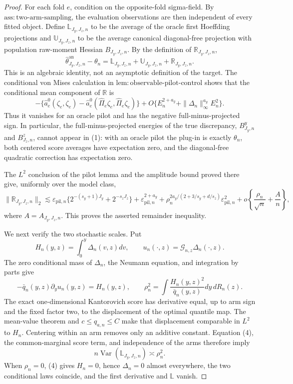 \documentclass{article}
\begin{document}
\begin{proof}
For each fold \(e\), condition on the opposite-fold sigma-field. By \(\mathrm{ass{:}two\text{-}arm\text{-}sampling}\), the evaluation observations are then independent of every fitted object.  Define \(\mathbb L_{J_y,J_z,n}\) to be the average of the oracle first Hoeffding projections and \(\mathbb U_{J_y,J_z,n}\) to be the average canonical diagonal-free projection with population raw-moment Hessian \(B_{J_y,J_z,n}\).  By the definition of \(\mathbb R_{J_y,J_z,n}\),
\[
\widehat\theta^{\mathrm{an}}_{J_y,J_z,n}-\theta_n
=\mathbb L_{J_y,J_z,n}+\mathbb U_{J_y,J_z,n}+\mathbb R_{J_y,J_z,n}. \tag{1}
\]
This is an algebraic identity, not an asymptotic definition of the target.  The conditional von Mises calculation in \(\mathrm{lem{:}observable\text{-}pilot\text{-}control}\) shows that the conditional mean component of \(\mathbb R\) is
\[
-\{\widehat a_e^0(\zeta_e,\zeta_e)
-\widehat a_e^0(\widehat\Pi_e\zeta_e,\widehat\Pi_e\zeta_e)\}
+O\{E_n^{2+a_y}+\|\Delta_n\|_\infty^{a_y}E_n^2\}.              \tag{2}
\]
Thus it vanishes for an oracle pilot and has the negative full-minus-projected sign.  In particular, the full-minus-projected energies of the true discrepancy, \(B^y_{J_y,n}\) and \(B^z_{J_z,n}\), cannot appear in (1): with an oracle pilot the plug-in is exactly \(\theta_n\), both centered score averages have expectation zero, and the diagonal-free quadratic correction has expectation zero.

The \(L^2\) conclusion of the pilot lemma and the amplitude bound proved there give, uniformly over the model class,
\[
\|\mathbb R_{J_y,J_z,n}\|_2
\lesssim
\varepsilon_{\mathrm{pil},n}\{2^{-(s_y+1)J_y}+2^{-s_zJ_z}\}
+\varepsilon_{\mathrm{pil},n}^{2+a_y}
+\rho_n^{2a_y/(2+3/s_y+d/s_z)}\varepsilon_{\mathrm{pil},n}^2
+o\!\left\{\frac{\rho_n}{\sqrt n}+\frac A n\right\},          \tag{3}
\]
where \(A=A_{J_y,J_z,n}\). This proves the asserted remainder inequality.

We next verify the two stochastic scales.  Put
\[
H_n(y,z)=\int_0^y\Delta_n(v,z)dv,
\qquad u_n(\cdot,z)=\mathcal G_{n,z}\Delta_n(\cdot,z).
\]
The zero conditional mass of \(\Delta_n\), the Neumann equation, and integration by parts give
\[
-\bar q_n(y,z)\partial_yu_n(y,z)=H_n(y,z),
\qquad
\rho_n^2=\int\frac{H_n(y,z)^2}{\bar q_n(y,z)}dy\,dR_n(z).       \tag{4}
\]
The exact one-dimensional Kantorovich score has derivative equal, up to arm sign and the fixed factor two, to the displacement of the optimal quantile map.  The mean-value theorem and \(c\le q_{a,n}\le C\) make that displacement comparable in \(L^2\) to \(H_n\).  Centering within an arm removes only an additive constant.  Equation (4), the common-marginal score term, and independence of the arms therefore imply
\[
n\operatorname{Var}(\mathbb L_{J_y,J_z,n})\asymp\rho_n^2.       \tag{5}
\]
When \(\rho_n=0\), (4) gives \(H_n=0\), hence \(\Delta_n=0\) almost everywhere, the two conditional laws coincide, and the first derivative and \(\mathbb L\) vanish.


\end{proof}
\end{document}
